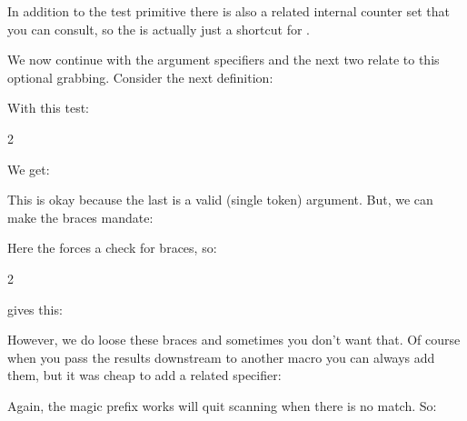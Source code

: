 \starttyping[option=TEX]
\tolerant{}
\stoptyping

In addition to the \type {\ifarguments} test primitive there is also a related
internal counter \type {\lastarguments} set that you can consult, so the \type
{\ifarguments} is actually just a shortcut for \typ {\ifcase \lastarguments}.

We now continue with the argument specifiers and the next two relate to this optional
grabbing. Consider the next definition:

\startbuffer[definition]
\tolerant{}
\stopbuffer

\typebuffer[definition][option=TEX] \getbuffer[definition]

With this test:

\startbuffer[example]
 {2}
\macro
\stopbuffer

\typebuffer[example][option=TEX]

We get:

\getbuffer[example]

This is okay because the last \type {\macro} is a valid (single token) argument. But, we
can make the braces mandate:

\startbuffer[definition]
\tolerant{}
\stopbuffer

\typebuffer[definition][option=TEX] \getbuffer[definition]

Here the \type {#=} forces a check for braces, so:

\startbuffer[example]
 {2}
\macro
\stopbuffer

\typebuffer[example][option=TEX]

gives this:

\getbuffer[example]

However, we do loose these braces and sometimes you don't want that. Of course when you pass the
results downstream to another macro you can always add them, but it was cheap to add a related
specifier:

\startbuffer[definition]
\tolerant{}
\stopbuffer

\typebuffer[definition][option=TEX] \getbuffer[definition]

Again, the magic \type {\tolerant} prefix works will quit scanning when there is
no match. So:

